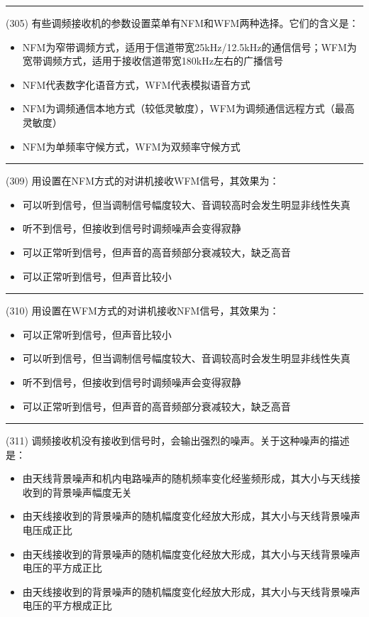 \documentclass[twocolumn,hyperref,UTF8]{ctexart}  %
\begin{document}
\noindent\rule{0.5\textwidth}{1pt}
\heiti (305) 有些调频接收机的参数设置菜单有NFM和WFM两种选择。它们的含义是： \songti {\color{gray} [LK0260] }
\begin{itemize}
	\item  NFM为窄带调频方式，适用于信道带宽25kHz/12.5kHz的通信信号；WFM为宽带调频方式，适用于接收信道带宽180kHz左右的广播信号
	\item  NFM代表数字化语音方式，WFM代表模拟语音方式
	\item  NFM为调频通信本地方式（较低灵敏度），WFM为调频通信远程方式（最高灵敏度）
	\item  NFM为单频率守候方式，WFM为双频率守候方式
\end{itemize}


\noindent\rule{0.5\textwidth}{1pt}
\heiti (309) 用设置在NFM方式的对讲机接收WFM信号，其效果为： \songti {\color{gray} [LK0788] }
\begin{itemize}
	\item  可以听到信号，但当调制信号幅度较大、音调较高时会发生明显非线性失真
	\item  听不到信号，但接收到信号时调频噪声会变得寂静
	\item  可以正常听到信号，但声音的高音频部分衰减较大，缺乏高音
	\item  可以正常听到信号，但声音比较小
\end{itemize}


\noindent\rule{0.5\textwidth}{1pt}
\heiti (310) 用设置在WFM方式的对讲机接收NFM信号，其效果为： \songti {\color{gray} [LK0789] }
\begin{itemize}
	\item  可以正常听到信号，但声音比较小
	\item  可以听到信号，但当调制信号幅度较大、音调较高时会发生明显非线性失真
	\item  听不到信号，但接收到信号时调频噪声会变得寂静
	\item  可以正常听到信号，但声音的高音频部分衰减较大，缺乏高音
\end{itemize}


\noindent\rule{0.5\textwidth}{1pt}
\heiti (311) 调频接收机没有接收到信号时，会输出强烈的噪声。关于这种噪声的描述是： \songti {\color{gray} [LK0790] }
\begin{itemize}
	\item  由天线背景噪声和机内电路噪声的随机频率变化经鉴频形成，其大小与天线接收到的背景噪声幅度无关
	\item  由天线接收到的背景噪声的随机幅度变化经放大形成，其大小与天线背景噪声电压成正比
	\item  由天线接收到的背景噪声的随机幅度变化经放大形成，其大小与天线背景噪声电压的平方成正比
	\item  由天线接收到的背景噪声的随机幅度变化经放大形成，其大小与天线背景噪声电压的平方根成正比
\end{itemize}
\end{document}
